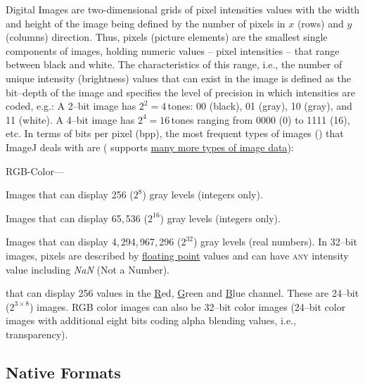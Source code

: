 Digital Images are two-dimensional grids of pixel
intensities values with the width and height of the image being defined
by the number of pixels in $x$ (rows) and $y$ (columns) direction.
Thus, pixels (picture elements) are the smallest single components
of images, holding numeric values -- pixel intensities -- that range
between black and white. The characteristics of this range, i.e.,
the number of unique intensity (brightness) values that can exist
in the image is defined as the bit--depth
of the image and specifies the level of precision in which intensities
are coded, e.g.: A 2--bit image has $2^{2}=4$\,tones: 00 (black),
01 (gray), 10 (gray), and 11 (white). A 4--bit image has $2^{4}=16$\,tones
ranging from 0000 (0) to 1111 (16), etc. In terms of bits per pixel
(bpp), the most frequent types
of images () that
ImageJ deals with are (
supports \href{http://imagejdev.org/imagej2-pixel-types}{many more types of image data}):
\begin{lyxlist}{RGB-Color---}
\item [{\textbf{8--bit}}] \noindent Images that can display 256 ($2^{8}$)
gray levels (integers only).
\item [{\textbf{16--bit}}] \noindent Images that can display 65,\,536
($2^{16}$) gray levels (integers only).
\item [{\textbf{32--bit}}] \noindent Images that can display 4,\,294,\,967,\,296
($2^{32}$) gray levels (real numbers). In 32--bit images, pixels
are described by \href{http://en.wikipedia.org/wiki/Floating_point}{floating point}
values and can have\textsc{ any} intensity value including \emph{NaN}
(Not a Number).
\item [{\textbf{RGB\ Color}}] \noindent {} that
can display 256 values in the \uline{R}ed, \uline{G}reen and
\uline{B}lue channel. These are 24--bit ($2^{3\times8}$) images.
RGB color images can also be 32--bit
color images (24--bit color images with additional eight bits coding
alpha blending values, i.e., transparency).
\end{lyxlist}

\subsection*{Native Formats\label{sub:Native-Formats}}

